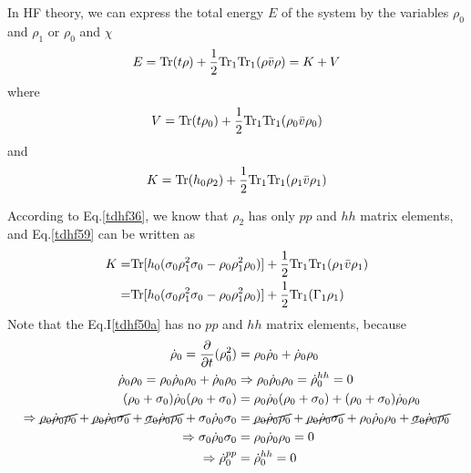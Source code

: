   In HF theory, we can express the total energy $E$ of the system by the variables $\rho_0$ and $\rho_1$ or $\rho_0$ and $\chi$
  \begin{equation}
    E = {\rm Tr}(t\rho) + \frac{1}{2}{\rm Tr}_1{\rm Tr}_1(\rho\bar{v}\rho) = K + V \label{tdhf57}
  \end{equation}
  where 
  \begin{equation}
    V =  {\rm Tr}(t\rho_0) + \frac{1}{2}{\rm Tr}_1{\rm Tr}_1(\rho_0 \bar{v} \rho_0) \label{tdhf58}
  \end{equation}
  and 
  \begin{equation}
    K =  {\rm Tr}(h_0 \rho_2) + \frac{1}{2}{\rm Tr}_1{\rm Tr}_1(\rho_1 \bar{v} \rho_1) \label{tdhf59}
  \end{equation}
  
  According to Eq.\eqref{tdhf36}, we know that $\rho_2$ has only $pp$ and $hh$ matrix elements, and Eq.\eqref{tdhf59} can be written as
  \begin{equation}
    \begin{aligned}
          K =& {\rm Tr}[h_0 (\sigma_0\rho_1^2\sigma_0 - \rho_0\rho_1^2\rho_0)] + \frac{1}{2}{\rm Tr}_1{\rm Tr}_1(\rho_1 \bar{v} \rho_1)\\
            =& {\rm Tr}[h_0 (\sigma_0\rho_1^2\sigma_0 - \rho_0\rho_1^2\rho_0)] + \frac{1}{2}{\rm Tr}_1(\Gamma_1 \rho_1) \label{tdhf60}
    \end{aligned}
  \end{equation}
  Note that the Eq.I\eqref{tdhf50a} has no $pp$ and $hh$ matrix elements, because
  \begin{equation}
    \begin{aligned}
      \dot{\rho}_0 = \frac{\partial}{\partial t}(\rho_0^2) &= \rho_0\dot{\rho}_0 + \dot{\rho}_0\rho_0\\ \label{tdhf61}
      \dot{\rho}_0\rho_0 = \rho_0\dot{\rho}_0\rho_0 + \dot{\rho}_0\rho_0 &\Rightarrow \rho_0\dot{\rho}_0\rho_0 = \dot{\rho}_0^{hh} = 0\\
      (\rho_0 + \sigma_0) \dot{\rho}_0 (\rho_0 + \sigma_0) &= \rho_0\dot{\rho}_0(\rho_0 + \sigma_0) + (\rho_0 + \sigma_0)\dot{\rho}_0\rho_0 \\
      \Rightarrow \cancel{\rho_0\dot{\rho}_0\rho_0} + \cancel{\rho_0\dot{\rho}_0\sigma_0} + \cancel{\sigma_0\dot{\rho}_0\rho_0} + \sigma_0\dot{\rho}_0\sigma_0 &= \cancel{\rho_0\dot{\rho}_0\rho_0} + \cancel{\rho_0\dot{\rho}_0\sigma_0} + \rho_0\dot{\rho}_0\rho_0 + \cancel{\sigma_0\dot{\rho}_0\rho_0}\\
      \Rightarrow \sigma_0\dot{\rho}_0\sigma_0 &= \rho_0\dot{\rho}_0\rho_0 = 0\\
      \Rightarrow \dot{\rho}_0^{pp} &= \dot{\rho}_0^{hh} = 0\\
    \end{aligned}
  \end{equation}

